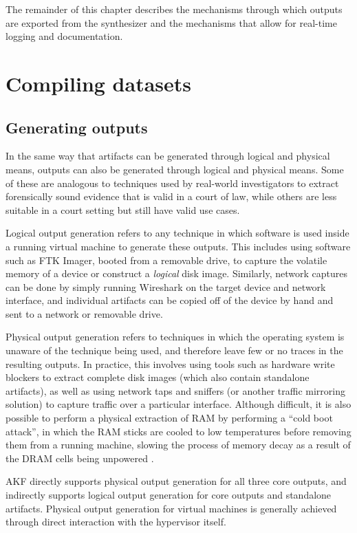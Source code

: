 The remainder of this chapter describes the mechanisms through which
outputs are exported from the synthesizer and the mechanisms that allow
for real-time logging and documentation.

\section{Compiling datasets}\label{compiling-datasets}

\subsection{Generating outputs}\label{generating-outputs}

In the same way that artifacts can be generated through logical and
physical means, outputs can also be generated through logical and
physical means. Some of these are analogous to techniques used by
real-world investigators to extract forensically sound evidence that is
valid in a court of law, while others are less suitable in a court
setting but still have valid use cases.

Logical output generation refers to any technique in which software is
used inside a running virtual machine to generate these outputs. This
includes using software such as FTK Imager, booted from a removable
drive, to capture the volatile memory of a device or construct a
\emph{logical} disk image. Similarly, network captures can be done by
simply running Wireshark on the target device and network interface, and
individual artifacts can be copied off of the device by hand and sent to
a network or removable drive.

Physical output generation refers to techniques in which the operating
system is unaware of the technique being used, and therefore leave few
or no traces in the resulting outputs. In practice, this involves using
tools such as hardware write blockers to extract complete disk images
(which also contain standalone artifacts), as well as using network taps
and sniffers (or another traffic mirroring solution) to capture traffic
over a particular interface. Although difficult, it is also possible to
perform a physical extraction of RAM by performing a ``cold boot
attack'', in which the RAM sticks are cooled to low temperatures before
removing them from a running machine, slowing the process of memory
decay as a result of the DRAM cells being unpowered
\cite{yitbarekColdBootAttacks2017}.

AKF directly supports physical output generation for all three core
outputs, and indirectly supports logical output generation for core
outputs and standalone artifacts. Physical output generation for virtual
machines is generally achieved through direct interaction with the
hypervisor itself.

